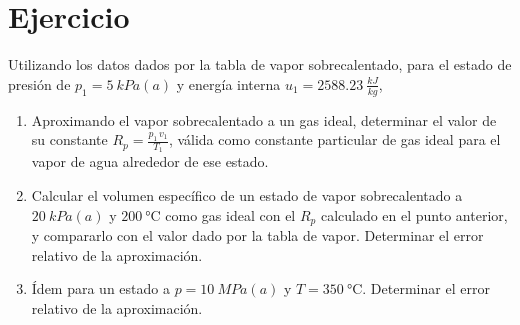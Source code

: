 \section{Ejercicio}\label{ej:Chap09Ejercicio05}
Utilizando los datos dados por la tabla de vapor sobrecalentado, para el estado de presión de $p_1=\SI{5}{kPa(a)}$ y energía interna $u_1=\SI{2588.23}{\frac{kJ}{kg}}$,
\begin{enumerate}
    \item Aproximando el vapor sobrecalentado a un gas ideal, determinar el valor de su constante $R_p=\frac{p_1\,v_1}{T_1}$, válida como constante particular de gas ideal para el vapor de agua alrededor de ese estado.
    \item Calcular el volumen específico de un estado de vapor sobrecalentado a $\SI{20}{kPa(a)}$ y $\SI{200}{\celsius}$ como gas ideal con el $R_p$ calculado en el punto anterior, y compararlo con el valor dado por la tabla de vapor. Determinar el error relativo de la aproximación.
    \item Ídem para un estado a $p=\SI{10}{MPa(a)}$ y $T=\SI{350}{\celsius}$. Determinar el error relativo de la aproximación.
\end{enumerate}
